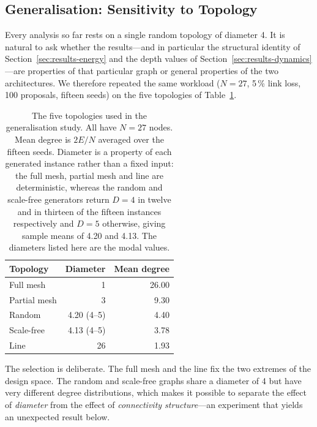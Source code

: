 \documentclass[journal]{IEEEtran}
\newcommand{\Nnodes}{N}                   %
\newcommand{\Diam}{D}                     %
\begin{document}
\subsection{Generalisation: Sensitivity to Topology}
\label{sec:results-topology}
Every analysis so far rests on a single random topology of diameter 4. It
is natural to ask whether the results---and in particular the structural
identity of Section~\ref{sec:results-energy} and the depth values of
Section~\ref{sec:results-dynamics}---are properties of that particular
graph or general properties of the two architectures. We therefore
repeated the same workload ($\Nnodes = 27$, 5\,\% link loss, 100
proposals, fifteen seeds) on the five topologies of
Table~\ref{tab:topologies}.

\begin{table}[!t]
\caption{The five topologies used in the generalisation study. All have
$\Nnodes = 27$ nodes. Mean degree is $2E/\Nnodes$ averaged over the fifteen
seeds. Diameter is a property of each generated instance rather than a fixed
input: the full mesh, partial mesh and line are deterministic, whereas the
random and scale-free generators return $\Diam = 4$ in twelve and in thirteen
of the fifteen instances respectively and $\Diam = 5$ otherwise, giving sample
means of 4.20 and 4.13. The diameters listed here are the modal values.}
\label{tab:topologies}
\centering
\footnotesize
\begin{tabular}{@{}lrr@{}}
\toprule
\textbf{Topology} & \textbf{Diameter} & \textbf{Mean degree} \\
\midrule
Full mesh    & 1  & 26.00 \\
Partial mesh & 3  & 9.30 \\
Random       & 4.20 (4--5)  & 4.40 \\
Scale-free   & 4.13 (4--5)  & 3.78 \\
Line         & 26 & 1.93 \\
\bottomrule
\end{tabular}
\end{table}

The selection is deliberate. The full mesh and the line fix the two
extremes of the design space. The random and scale-free graphs share a
diameter of 4 but have very different degree distributions, which makes it
possible to separate the effect of \emph{diameter} from the effect of
\emph{connectivity structure}---an experiment that yields an unexpected
result below.
\end{document}
